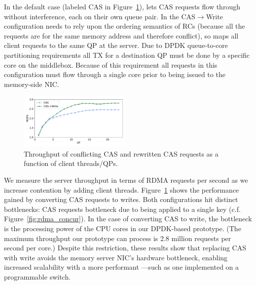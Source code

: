In the default case (labeled CAS in Figure~\ref{fig:cas_vs_swap}),
{\sword} lets CAS requests flow through without interference, each
on their own queue pair.  In the CAS$\rightarrow$Write configuration
{\sword} needs to rely upon the ordering semantics of RCs (because all
the requests are for the same memory address and therefore
conflict), so maps all client requests to the same QP at the server.
Due to DPDK queue-to-core partitioning requirements all TX for a
destination QP must be done by a specific core on the
middlebox. Because of this requirement all requests in this
configuration must flow through a single core prior to being issued to
the memory-side NIC.


\begin{figure}[t]
    \includegraphics[width=0.485\textwidth]{fig/cas_vs_swap.pdf}
    \caption{Throughput of conflicting CAS and rewritten CAS requests as a function of client threads/QPs.}
    \label{fig:cas_vs_swap}
\end{figure}


We measure the server throughput in terms of RDMA requests per second as
we increase contention by adding client threads.
Figure~\ref{fig:cas_vs_swap} shows the performance gained by
converting CAS requests to writes. Both configurations hit distinct
bottlenecks: CAS requests bottleneck due to being applied to a
single key (c.f. Figure~\ref{fig:rdma_concur}). In the case of
converting CAS to write, the bottleneck is the processing power of the
CPU cores in our DPDK-based {\sword} prototype. (The maximum throughput
our prototype can process is 2.8 million requests per second per
core.)
Despite this restriction, these results show that
replacing CAS with write avoids the memory server NIC's hardware
bottleneck, enabling increased scalability with a more performant
{\sword}---such as one implemented on a programmable switch.
